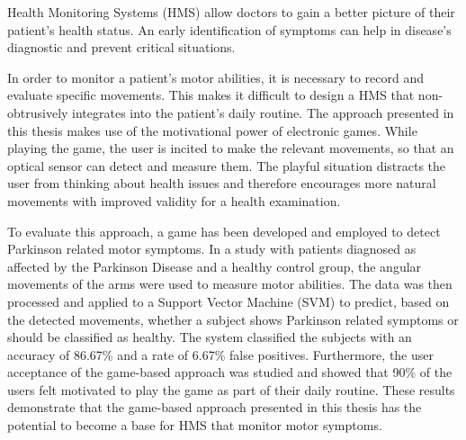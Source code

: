 Health Monitoring Systems (HMS) allow doctors to gain a better picture of their patient’s health status. An early identification of symptoms can help in disease's diagnostic and prevent critical situations.

In order to monitor a patient’s motor abilities, it is necessary to record and evaluate specific movements. This makes it difficult to design a HMS that non-obtrusively integrates into the patient’s daily routine. The approach presented in this thesis makes use of the motivational power of electronic games. While playing the game, the user is incited to make the relevant movements, so that an optical sensor can detect and measure them. The playful situation distracts the user from thinking about health issues and therefore encourages more natural movements with improved validity for a health examination.

To evaluate this approach, a game has been developed and employed to detect Parkinson related motor symptoms.  In a study with patients diagnosed as affected by the Parkinson Disease and a healthy control group, the angular movements of the arms were used to measure motor abilities. The data was then processed and applied to a Support Vector Machine (SVM) to predict, based on the detected movements, whether a subject shows Parkinson related symptoms or should be classified as healthy. The system classified the subjects with an accuracy of 86.67\% and a rate of 6.67\% false positives. Furthermore, the user acceptance of the game-based approach was studied and showed that 90\% of the users felt motivated to play the game as part of their daily routine. These results demonstrate that the game-based approach presented in this thesis has the potential to become a base for HMS that monitor motor symptoms.
